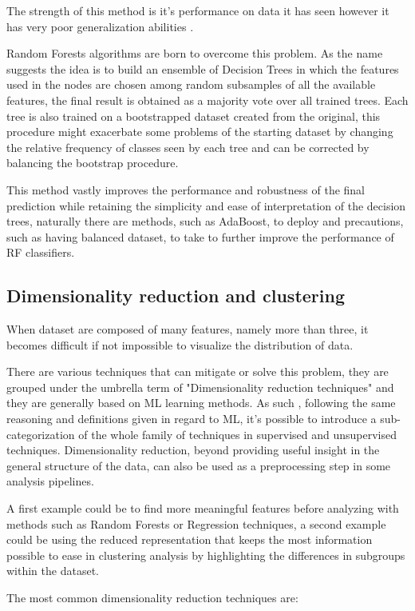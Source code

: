 The strength of this method is it's performance on data it has seen however it has very poor generalization abilities \cite{StatisticalLearning}. 

Random Forests algorithms are born to overcome this problem. As the name suggests the idea is to build an ensemble of Decision Trees in which the features used in the nodes are chosen among random subsamples of all the available features, the final result is obtained as a majority vote over all trained trees. Each tree is also trained on a bootstrapped dataset created from the original, this procedure might exacerbate some problems of the starting dataset by changing the relative frequency of classes seen by each tree and can be corrected by balancing the bootstrap procedure.

This method vastly improves the performance and robustness of the final prediction while retaining the simplicity and ease of interpretation of the decision trees, naturally there are methods, such as AdaBoost, to deploy and precautions, such as having balanced dataset, to take to further improve the performance of RF classifiers.

\subsection{Dimensionality reduction and clustering}
When dataset are composed of many features, namely more than three, it becomes difficult if not impossible to visualize the distribution of data. 

There are various techniques that can mitigate or solve this problem, they are grouped under the umbrella term of "Dimensionality reduction techniques" and they are generally based on ML learning methods. As such , following the same reasoning and definitions given in regard to ML, it's possible to introduce a sub-categorization of the whole family of techniques in supervised and unsupervised techniques. Dimensionality reduction, beyond providing useful insight in the general structure of the data, can also be used as a preprocessing step in some analysis pipelines.

A first example could be to find more meaningful features before analyzing with methods such as Random Forests or Regression techniques, a second example could be using the reduced representation that keeps the most information possible to ease in clustering analysis by highlighting the differences in subgroups within the dataset. 

The most common dimensionality reduction techniques are:

